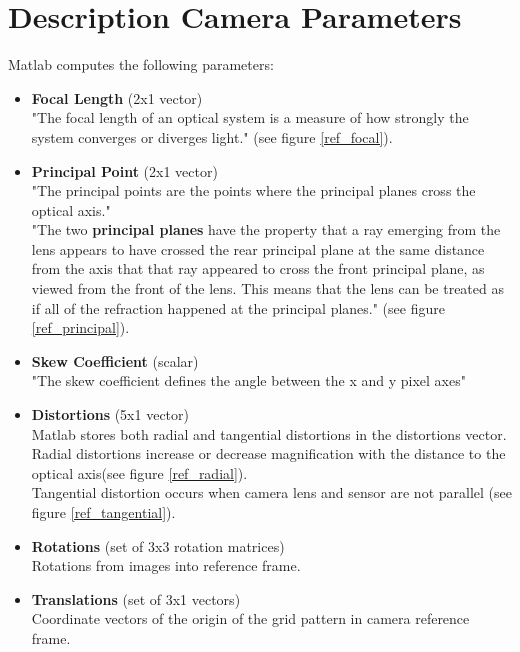 \documentclass[paper=a4, fontsize=11pt]{scrartcl} %
\numberwithin{equation}{section} %
\numberwithin{figure}{section} %
\numberwithin{table}{section} %
\begin{document}
\section{Description Camera Parameters}
Matlab computes the following parameters:
\begin{itemize}
	\item \textbf{Focal Length} (2x1 vector)\\
	"The focal length of an optical system is a measure of how strongly the system converges or diverges light." \cite{wiki} (see figure \ref{ref_focal}).
	
	\item \textbf{Principal Point} (2x1 vector)\\
	"The principal points are the points where the principal planes cross the optical axis."\cite{wiki}\\
	"The two \textbf{principal planes} have the property that a ray emerging from the lens appears to have crossed the rear principal plane at the same distance from the axis that that ray appeared to cross the front principal plane, as viewed from the front of the lens. This means that the lens can be treated as if all of the refraction happened at the principal planes."\cite{wiki} (see figure \ref{ref_principal}).
	
	\item \textbf{Skew Coefficient} (scalar)\\
	"The skew coefficient defines the angle between the x and y pixel axes"\cite{calibration}
	
	
	\item \textbf{Distortions} (5x1 vector)\\
	Matlab stores both radial and tangential distortions in the distortions vector.\cite{calibration}\\
	Radial distortions increase or decrease magnification with the distance to the optical axis\cite{wiki}(see figure \ref{ref_radial}).\\
	Tangential distortion occurs when camera lens and sensor are not parallel (see figure \ref{ref_tangential}).
	
	\item \textbf{Rotations} (set of 3x3 rotation matrices)\\
	Rotations from images into reference frame.\cite{calibration}
	
	\item \textbf{Translations} (set of 3x1 vectors)\\
	Coordinate vectors of the origin of the grid pattern in camera reference frame. \cite{calibration}
	
\end{itemize}
\end{document}
